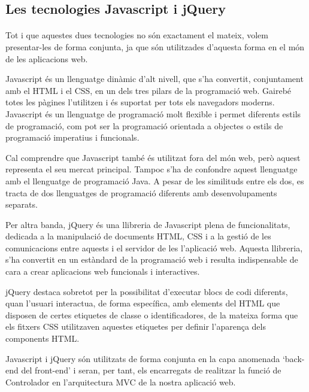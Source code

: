 \subsection{Les tecnologies Javascript i jQuery}

    \paragraph{}
    Tot i que aquestes dues tecnologies no són exactament el mateix, volem presentar-les de forma conjunta, ja que són utilitzades d’aquesta forma en el món de les aplicacions web.

    Javascript és un llenguatge dinàmic d'alt nivell, que s'ha convertit, conjuntament amb el HTML i el CSS, en un dels tres pilars de la programació web. Gairebé totes les pàgines l'utilitzen i és suportat per tots els navegadors moderns. Javascript és un llenguatge de programació molt flexible i permet diferents estils de programació, com pot ser la programació orientada a objectes o estils de programació imperatius i funcionals.

    Cal comprendre que Javascript també és utilitzat fora del món web, però aquest  representa el seu mercat principal. Tampoc s'ha de confondre aquest llenguatge amb el llenguatge de programació Java. A pesar de les similituds entre els dos, es tracta de dos llenguatges de programació diferents amb desenvolupaments separats.

    Per altra banda, jQuery és una llibreria de Javascript plena de funcionalitats, dedicada a la manipulació de documents HTML, CSS i a la gestió de les comunicacions entre aquests i el servidor de les l’aplicació web. Aquesta llibreria, s'ha convertit en un estàndard de la programació web i resulta indispensable de cara a crear aplicacions web funcionals i interactives.

    jQuery destaca sobretot per la possibilitat d’executar blocs de codi diferents, quan l’usuari interactua, de forma específica, amb elements del HTML que disposen de certes etiquetes de classe o identificadores, de la mateixa forma que els fitxers CSS utilitzaven aquestes etiquetes per definir l’aparença dels components HTML.

    Javascript i jQuery són utilitzats de forma conjunta en la capa anomenada `back-end del front-end’ i seran, per tant, els encarregats de realitzar la funció de Controlador en l'arquitectura MVC de la nostra aplicació web.

